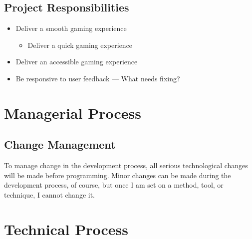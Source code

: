 \documentclass[11pt]{article}
\begin{document}
\subsection{Project Responsibilities}
\label{sec:orge74784d}
\begin{itemize}
\item Deliver a smooth gaming experience
\begin{itemize}
\item Deliver a quick gaming experience
\end{itemize}
\item Deliver an accessible gaming experience
\item Be responsive to user feedback --- What needs fixing?
\end{itemize}
\section{Managerial Process}
\label{sec:org92917ce}
\subsection{Change Management}
\label{sec:org8ff4f55}
To manage change in the development process, all serious technological changes will be made before programming.
Minor changes can be made during the development process, of course, but once I am set on a method, tool,
or technique, I cannot change it. 
\section{Technical Process}
\label{sec:org75f4778}
\end{document}
